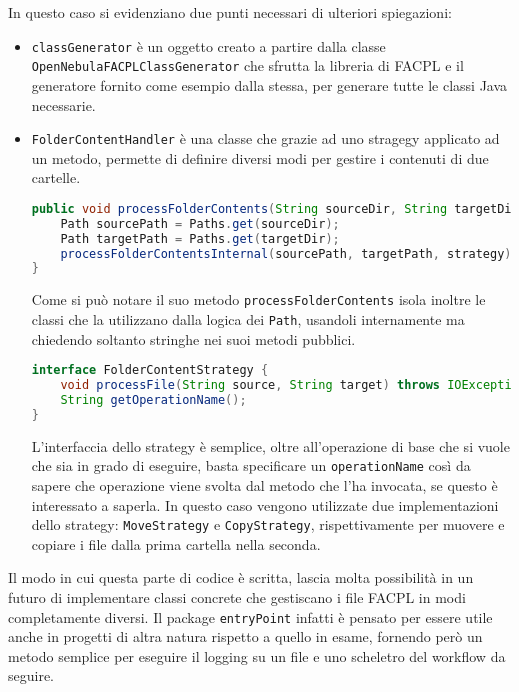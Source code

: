 In questo caso si evidenziano due punti necessari di ulteriori spiegazioni:
\begin{itemize}
    \item \texttt{classGenerator} è un oggetto creato a partire dalla classe \texttt{OpenNebulaFACPLClassGenerator} che sfrutta la libreria di FACPL e il generatore fornito come esempio dalla stessa, per generare tutte le classi Java necessarie.
    \item \texttt{FolderContentHandler} è una classe che grazie ad uno stragegy\cite{GOF} applicato ad un metodo, permette di definire diversi modi per gestire i contenuti di due cartelle.
    \begin{lstlisting}[language=Java, xleftmargin=1em, caption=Metodo processFolderContent, label=code:processFolderContent, basicstyle=\fontsize{9.5}{10}\ttfamily]
public void processFolderContents(String sourceDir, String targetDir, FolderContentStrategy strategy) throws IOException {
    Path sourcePath = Paths.get(sourceDir);
    Path targetPath = Paths.get(targetDir);
    processFolderContentsInternal(sourcePath, targetPath, strategy);
}
            \end{lstlisting}
    Come si può notare il suo metodo \texttt{processFolderContents} isola inoltre le classi che la utilizzano dalla logica dei \texttt{Path}, usandoli internamente ma chiedendo soltanto stringhe nei suoi metodi pubblici.
    \begin{lstlisting}[language=Java, xleftmargin=1em, caption=Interfaccia FolderContentStrategy, label=code:FolderContentStrategy, basicstyle=\fontsize{9.5}{10}\ttfamily]
interface FolderContentStrategy {
    void processFile(String source, String target) throws IOException;
    String getOperationName();
}
    \end{lstlisting}
    L'interfaccia dello strategy è semplice, oltre all'operazione di base che si vuole che sia in grado di eseguire, basta specificare un \texttt{operationName} così da sapere che operazione viene svolta dal metodo che l'ha invocata, se questo è interessato a saperla.
    In questo caso vengono utilizzate due implementazioni dello strategy: \texttt{MoveStrategy} e \texttt{CopyStrategy}, rispettivamente per muovere e copiare i file dalla prima cartella nella seconda.
\end{itemize}
Il modo in cui questa parte di codice è scritta, lascia molta possibilità in un futuro di implementare classi concrete che gestiscano i file FACPL in modi completamente diversi. Il package \texttt{entryPoint} infatti è pensato per essere utile anche in progetti di altra natura rispetto a quello in esame, fornendo però un metodo semplice per eseguire il logging su un file e uno scheletro del workflow da seguire.

